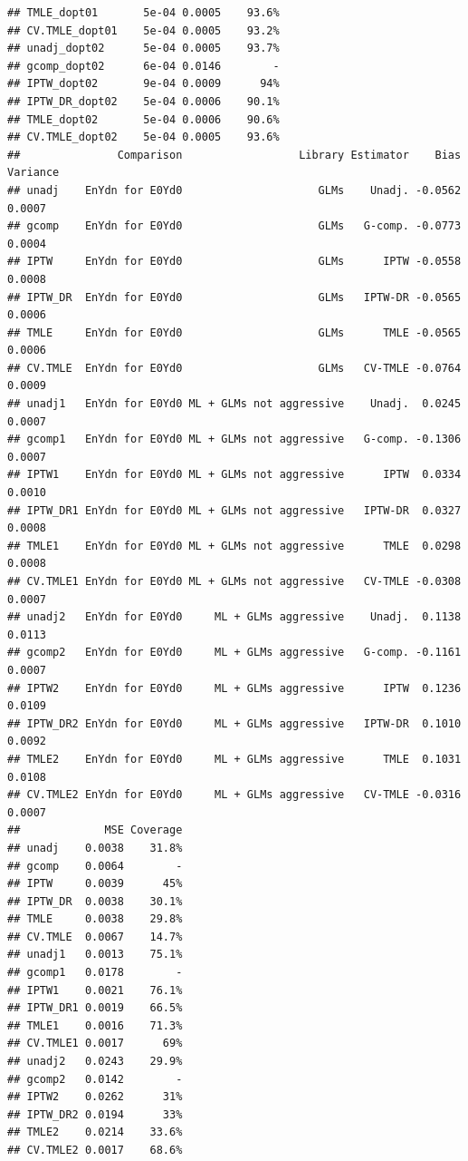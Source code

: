 \documentclass[11pt]{article}\usepackage[]{graphicx}\usepackage[]{color}
\makeatletter
\newenvironment{kframe}{%
 \def\at@end@of@kframe{}%
 \ifinner\ifhmode%
  \def\at@end@of@kframe{\end{minipage}}%
  \begin{minipage}{\columnwidth}%
 \fi\fi%
 \def\FrameCommand##1{\hskip\@totalleftmargin \hskip-\fboxsep
 \colorbox{shadecolor}{##1}\hskip-\fboxsep
     \hskip-\linewidth \hskip-\@totalleftmargin \hskip\columnwidth}%
 \MakeFramed {\advance\hsize-\width
   \@totalleftmargin\z@ \linewidth\hsize
   \@setminipage}}%
 {\par\unskip\endMakeFramed%
 \at@end@of@kframe}
\newenvironment{knitrout}{}{} %
\makeatother
\begin{document}
\begin{knitrout}
\begin{kframe}
\begin{verbatim}
## TMLE_dopt01       5e-04 0.0005    93.6%
## CV.TMLE_dopt01    5e-04 0.0005    93.2%
## unadj_dopt02      5e-04 0.0005    93.7%
## gcomp_dopt02      6e-04 0.0146        -
## IPTW_dopt02       9e-04 0.0009      94%
## IPTW_DR_dopt02    5e-04 0.0006    90.1%
## TMLE_dopt02       5e-04 0.0006    90.6%
## CV.TMLE_dopt02    5e-04 0.0005    93.6%
##               Comparison                  Library Estimator    Bias Variance
## unadj    EnYdn for E0Yd0                     GLMs    Unadj. -0.0562   0.0007
## gcomp    EnYdn for E0Yd0                     GLMs   G-comp. -0.0773   0.0004
## IPTW     EnYdn for E0Yd0                     GLMs      IPTW -0.0558   0.0008
## IPTW_DR  EnYdn for E0Yd0                     GLMs   IPTW-DR -0.0565   0.0006
## TMLE     EnYdn for E0Yd0                     GLMs      TMLE -0.0565   0.0006
## CV.TMLE  EnYdn for E0Yd0                     GLMs   CV-TMLE -0.0764   0.0009
## unadj1   EnYdn for E0Yd0 ML + GLMs not aggressive    Unadj.  0.0245   0.0007
## gcomp1   EnYdn for E0Yd0 ML + GLMs not aggressive   G-comp. -0.1306   0.0007
## IPTW1    EnYdn for E0Yd0 ML + GLMs not aggressive      IPTW  0.0334   0.0010
## IPTW_DR1 EnYdn for E0Yd0 ML + GLMs not aggressive   IPTW-DR  0.0327   0.0008
## TMLE1    EnYdn for E0Yd0 ML + GLMs not aggressive      TMLE  0.0298   0.0008
## CV.TMLE1 EnYdn for E0Yd0 ML + GLMs not aggressive   CV-TMLE -0.0308   0.0007
## unadj2   EnYdn for E0Yd0     ML + GLMs aggressive    Unadj.  0.1138   0.0113
## gcomp2   EnYdn for E0Yd0     ML + GLMs aggressive   G-comp. -0.1161   0.0007
## IPTW2    EnYdn for E0Yd0     ML + GLMs aggressive      IPTW  0.1236   0.0109
## IPTW_DR2 EnYdn for E0Yd0     ML + GLMs aggressive   IPTW-DR  0.1010   0.0092
## TMLE2    EnYdn for E0Yd0     ML + GLMs aggressive      TMLE  0.1031   0.0108
## CV.TMLE2 EnYdn for E0Yd0     ML + GLMs aggressive   CV-TMLE -0.0316   0.0007
##             MSE Coverage
## unadj    0.0038    31.8%
## gcomp    0.0064        -
## IPTW     0.0039      45%
## IPTW_DR  0.0038    30.1%
## TMLE     0.0038    29.8%
## CV.TMLE  0.0067    14.7%
## unadj1   0.0013    75.1%
## gcomp1   0.0178        -
## IPTW1    0.0021    76.1%
## IPTW_DR1 0.0019    66.5%
## TMLE1    0.0016    71.3%
## CV.TMLE1 0.0017      69%
## unadj2   0.0243    29.9%
## gcomp2   0.0142        -
## IPTW2    0.0262      31%
## IPTW_DR2 0.0194      33%
## TMLE2    0.0214    33.6%
## CV.TMLE2 0.0017    68.6%
\end{verbatim}
\end{kframe}
\end{knitrout}
\end{document}
